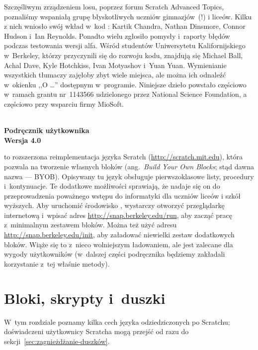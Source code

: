 \documentclass[a4paper]{report}
\begin{document}
Szczęśliwym zrządzeniem losu, poprzez forum Scratch Advanced Topics, poznaliśmy wspaniałą grupę błyskotliwych uczniów gimnazjów~(!\@) i liceów. Kilku z nich wniosło swój wkład w~kod : Kartik Chandra, Nathan Dinsmore, Connor Hudson i~Ian Reynolds. Ponadto wielu zgłosiło pomysły i~raporty błędów podczas testowania wersji alfa. Wśród studentów Uniwersytetu Kalifornijskiego w~Berkeley, którzy przyczynili się do rozwoju kodu, znajdują się Michael Ball, Achal Dave, Kyle Hotchkiss, Ivan Motyashov i~Yuan Yuan. Wymienianie wszystkich tłumaczy zajęłoby zbyt wiele miejsca, ale można ich odnaleźć w~okienku ,,O \Snap{}\ldots'' dostępnym w~programie. Niniejsze dzieło powstało częściowo w~ramach grantu nr~1143566 udzielonego przez National Science Foundation, a częściowo przy wsparciu firmy MioSoft.

\clearpage

\begin{center}
\bf \Huge \Snap{} \\
Podręcznik użytkownika \\
\huge Wersja 4.0 \vspace{40pt}
\end{center}

\Snap{} to rozszerzona reimplementacja języka Scratch (\url{http://scratch.mit.edu}), która pozwala na tworzenie własnych bloków (ang.\ \textit{Build Your Own Blocks}; stąd dawna nazwa  --- BYOB). Opisywany tu język obsługuje pierwszoklasowe listy, procedury i~kontynuacje. Te dodatkowe możliwości sprawiają, że nadaje się on do przeprowadzenia poważnego wstępu do informatyki dla uczniów liceów i szkół wyższych. Aby uruchomić środowisko \Snap{}, wystarczy otworzyć przeglądarkę internetową i~wpisać adres \url{http://snap.berkeley.edu/run}, aby zacząć pracę z~minimalnym zestawem bloków. Można też użyć adresu \url{http://snap.berkeley.edu/init}, aby załadować niewielki zestaw dodatkowych bloków. Wiąże się to z~nieco wolniejszym ładowaniem, ale jest zalecane dla wygody użytkowników (w~dalszej części podręcznika będziemy zakładali korzystanie z~tej właśnie metody).

\clearpage

\chapter{Bloki, skrypty i~duszki}

W~tym rozdziale poznamy kilka cech języka \Snap{} odziedziczonych po Scratchu; doświadczeni użytkownicy Scratcha mogą przejść od razu do sekcji~\ref{sec:zagnieżdżanie-duszków}.
\end{document}
